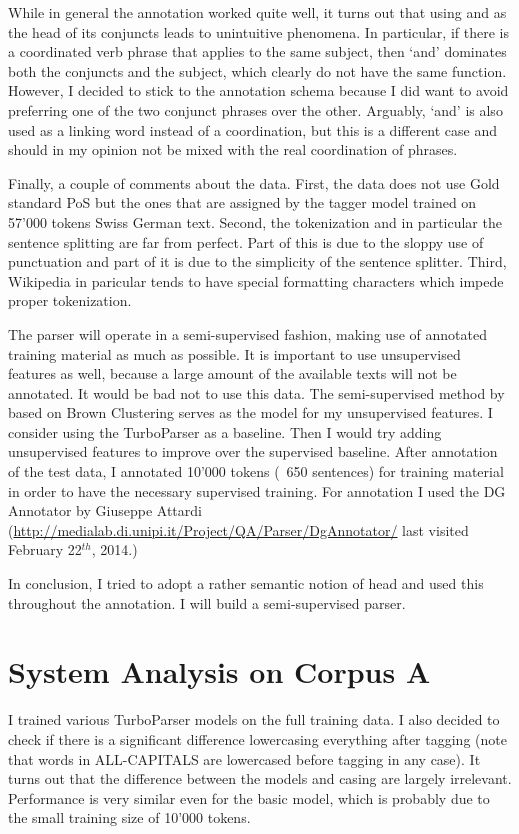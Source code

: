 \documentclass[11pt,letterpaper, covington]{article}
\begin{document}
While in general the annotation worked quite well, it turns out that using and as the head of its conjuncts leads to unintuitive phenomena. In particular, if there is a coordinated verb phrase that applies to the same subject, then `and' dominates both the conjuncts and the subject, which clearly do not have the same function. However, I decided to stick to the annotation schema because I did want to avoid preferring one of the two conjunct phrases over the other. Arguably, `and' is also used as a linking word instead of a coordination, but this is a different case and should in my opinion not be mixed with the real coordination of phrases. 

Finally, a couple of comments about the data. First, the data does not use Gold standard PoS but the ones that are assigned by the tagger model trained on 57'000 tokens Swiss German text. Second, the tokenization and in particular the sentence splitting are far from perfect. Part of this is due to the sloppy use of punctuation and part of it is due to the simplicity of the sentence splitter. Third, Wikipedia in paricular tends to have special formatting characters which impede proper tokenization. 

The parser will operate in a semi-supervised fashion, making use of annotated training material as much as possible. It is important to use unsupervised features as well, because a large amount of the available texts will not be annotated. It would be bad not to use this data. The semi-supervised method by \citet{KCC08} based on Brown Clustering serves as the model for my unsupervised features.  I consider using the TurboParser \citep{MSXAF10} as a baseline. Then I would try adding unsupervised features to improve over the supervised baseline.
After annotation of the test data, I annotated 10'000 tokens (~650 sentences) for training material in order to have the necessary supervised training. For annotation I used the DG Annotator by Giuseppe Attardi (\url{http://medialab.di.unipi.it/Project/QA/Parser/DgAnnotator/} last visited February 22$^{th}$, 2014.) 

In conclusion, I tried to adopt a rather semantic notion of head and used this throughout the annotation. I will build a semi-supervised parser.

\section{System Analysis on Corpus A}

I trained various TurboParser models on the full training data. I also decided to check if there is a significant difference lowercasing everything  after tagging (note that words in ALL-CAPITALS are lowercased before tagging in any case). It turns out that the difference between the models and casing are largely irrelevant. Performance is very similar even for the basic model, which is probably due to the small training size of 10'000 tokens.
\end{document}
